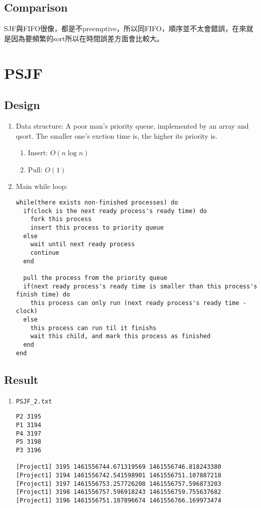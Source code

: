 \documentclass[12pt, a4paper]{article}
\begin{document}
\subsection{Comparison}
SJF與FIFO很像，都是不preemptive，所以同FIFO，順序並不太會錯誤，在來就是因為要頻繁的sort所以在時間誤差方面會比較大。

\section{PSJF}
\subsection{Design}
\begin{enumerate}
\item Data structure: A poor man's priority queue, implemented by an array and
  qsort. The smaller one's exction time is, the higher its priority is.
  \begin{enumerate}
  \item Insert: $O(n \log n)$
  \item Pull: $O(1)$
  \end{enumerate}
\item Main while loop:
\begin{verbatim}
while(there exists non-finished processes) do
  if(clock is the next ready process's ready time) do
    fork this process
    insert this process to priority queue
  else
    wait until next ready process 
    continue
  end

  pull the process from the priority queue
  if(next ready process's ready time is smaller than this process's finish time) do
    this process can only run (next ready process's ready time - clock)
  else
    this process can run til it finishs
    wait this child, and mark this process as finished
  end
end
\end{verbatim}
\end{enumerate}

\subsection{Result}
\begin{enumerate}
\item \texttt{PSJF\_2.txt}
\begin{verbatim}
P2 3195
P1 3194
P4 3197
P5 3198
P3 3196

[Project1] 3195 1461556744.671319569 1461556746.818243380
[Project1] 3194 1461556742.541598901 1461556751.107887218
[Project1] 3197 1461556753.257726208 1461556757.596873203
[Project1] 3198 1461556757.596918243 1461556759.755637682
[Project1] 3196 1461556751.107896674 1461556766.169973474
\end{verbatim}
\end{enumerate}
\end{document}
